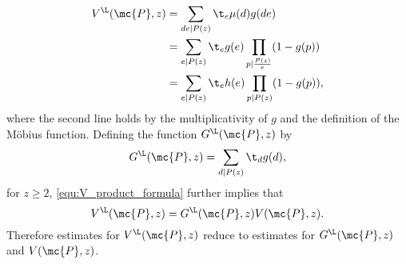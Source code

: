     \begin{align*}
      V^{\L}(\mc{P},z) &= \sum_{de \mid P(z)}\t_{e}\mu(d)g(de) \\
      &= \sum_{e \mid P(z)}\t_{e}g(e)\prod_{p \mid \frac{P(z)}{e}}(1-g(p)) \\
      &= \sum_{e \mid P(z)}\t_{e}h(e)\prod_{p \mid P(z)}(1-g(p)),
    \end{align*}
    where the second line holds by the multiplicativity of $g$ and the definition of the M\"obius function. Defining the function $G^{\L}(\mc{P},z)$ by
    \[
      G^{\L}(\mc{P},z) = \sum_{d \mid P(z)}\t_{d}g(d),
    \]
    for $z \ge 2$, \cref{equ:V_product_formula} further implies that
    \[
      V^{\L}(\mc{P},z) = G^{\L}(\mc{P},z)V(\mc{P},z).
    \]
    Therefore estimates for $V^{\L}(\mc{P},z)$ reduce to estimates for $G^{\L}(\mc{P},z)$ and $V(\mc{P},z)$.